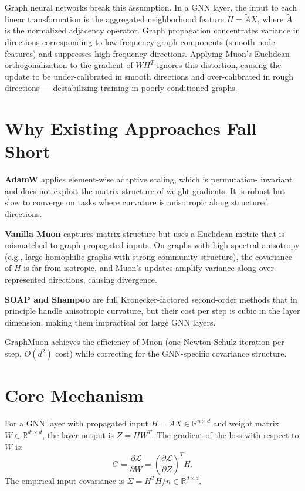 \documentclass[10pt,twocolumn]{article}
\begin{document}
Graph neural networks break this assumption. In a GNN layer, the input to each
linear transformation is the aggregated neighborhood feature $H = \tilde{A}X$,
where $\tilde{A}$ is the normalized adjacency operator. Graph propagation
concentrates variance in directions corresponding to low-frequency graph
components (smooth node features) and suppresses high-frequency directions.
Applying Muon's Euclidean orthogonalization to the gradient of $WH^T$ ignores
this distortion, causing the update to be under-calibrated in smooth directions
and over-calibrated in rough directions --- destabilizing training in poorly
conditioned graphs.

\section{Why Existing Approaches Fall Short}

\textbf{AdamW} applies element-wise adaptive scaling, which is permutation-
invariant and does not exploit the matrix structure of weight gradients.
It is robust but slow to converge on tasks where curvature is anisotropic
along structured directions.

\textbf{Vanilla Muon} captures matrix structure but uses a Euclidean metric
that is mismatched to graph-propagated inputs. On graphs with high spectral
anisotropy (e.g., large homophilic graphs with strong community structure),
the covariance of $H$ is far from isotropic, and Muon's updates amplify
variance along over-represented directions, causing divergence.

\textbf{SOAP and Shampoo} are full Kronecker-factored second-order methods that
in principle handle anisotropic curvature, but their cost per step is cubic in
the layer dimension, making them impractical for large GNN layers.

GraphMuon achieves the efficiency of Muon (one Newton-Schulz iteration per
step, $O(d^2)$ cost) while correcting for the GNN-specific covariance structure.

\section{Core Mechanism}

For a GNN layer with propagated input $H = \tilde{A}X \in \mathbb{R}^{n \times d}$
and weight matrix $W \in \mathbb{R}^{d' \times d}$, the layer output is $Z = HW^T$.
The gradient of the loss with respect to $W$ is:
\[
  G = \frac{\partial \mathcal{L}}{\partial W} = \left(\frac{\partial \mathcal{L}}{\partial Z}\right)^T H.
\]
The empirical input covariance is $\Sigma = H^T H / n \in \mathbb{R}^{d\times d}$.
\end{document}
